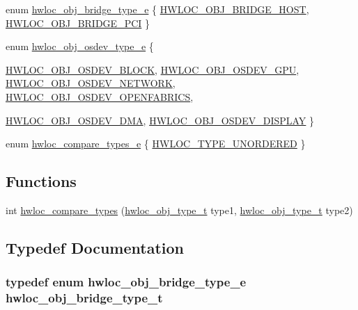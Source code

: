 \begin{DoxyCompactItemize}
enum \hyperlink{a00041_ga48a4803c72574191d7ead1c62aaf9860}{hwloc\_\-obj\_\-bridge\_\-type\_\-e} \{ \hyperlink{a00041_gga48a4803c72574191d7ead1c62aaf9860a2c7660f3864ad2810c1e72aad285e574}{HWLOC\_\-OBJ\_\-BRIDGE\_\-HOST}, 
\hyperlink{a00041_gga48a4803c72574191d7ead1c62aaf9860a8f3b4cecf3dab6073d74696d10863c60}{HWLOC\_\-OBJ\_\-BRIDGE\_\-PCI}
 \}
\item 
enum \hyperlink{a00041_ga64f5d539df299c97ae80ce53fc4b56c0}{hwloc\_\-obj\_\-osdev\_\-type\_\-e} \{ \par
\hyperlink{a00041_gga64f5d539df299c97ae80ce53fc4b56c0a689b0488c3c0d08d116751c6b9cb8871}{HWLOC\_\-OBJ\_\-OSDEV\_\-BLOCK}, 
\hyperlink{a00041_gga64f5d539df299c97ae80ce53fc4b56c0aa3a09798ef2836abb236dc3a645ffc90}{HWLOC\_\-OBJ\_\-OSDEV\_\-GPU}, 
\hyperlink{a00041_gga64f5d539df299c97ae80ce53fc4b56c0ab715d81155f771573c8682dffc65021b}{HWLOC\_\-OBJ\_\-OSDEV\_\-NETWORK}, 
\hyperlink{a00041_gga64f5d539df299c97ae80ce53fc4b56c0a52157d03694fdae82dddd57ca8c973b6}{HWLOC\_\-OBJ\_\-OSDEV\_\-OPENFABRICS}, 
\par
\hyperlink{a00041_gga64f5d539df299c97ae80ce53fc4b56c0a827ad1643360711a8b6c6af671366791}{HWLOC\_\-OBJ\_\-OSDEV\_\-DMA}, 
\hyperlink{a00041_gga64f5d539df299c97ae80ce53fc4b56c0a5da1cc266d3d288fdc639b0e800e9da4}{HWLOC\_\-OBJ\_\-OSDEV\_\-DISPLAY}
 \}
\item 
enum \hyperlink{a00041_ga46323568968005137c32f6a1cd405b74}{hwloc\_\-compare\_\-types\_\-e} \{ \hyperlink{a00041_gga46323568968005137c32f6a1cd405b74a2f8297ea36eba46e7596e810a67298fb}{HWLOC\_\-TYPE\_\-UNORDERED}
 \}
\end{DoxyCompactItemize}
\subsection*{Functions}
\begin{DoxyCompactItemize}
\item 
 int \hyperlink{a00041_gabd7da4f4ea12b420b8ecbde458b27805}{hwloc\_\-compare\_\-types} (\hyperlink{a00041_gacd37bb612667dc437d66bfb175a8dc55}{hwloc\_\-obj\_\-type\_\-t} type1, \hyperlink{a00041_gacd37bb612667dc437d66bfb175a8dc55}{hwloc\_\-obj\_\-type\_\-t} type2) 
\end{DoxyCompactItemize}


\subsection{Typedef Documentation}
\hypertarget{a00041_ga0a947e8c5adcc729b126bd09c01a0153}{
\subsubsection[{hwloc\_\-obj\_\-bridge\_\-type\_\-t}]{\setlength{\rightskip}{0pt plus 5cm}typedef enum {\bf hwloc\_\-obj\_\-bridge\_\-type\_\-e}  {\bf hwloc\_\-obj\_\-bridge\_\-type\_\-t}}}
\label{a00041_ga0a947e8c5adcc729b126bd09c01a0153}


